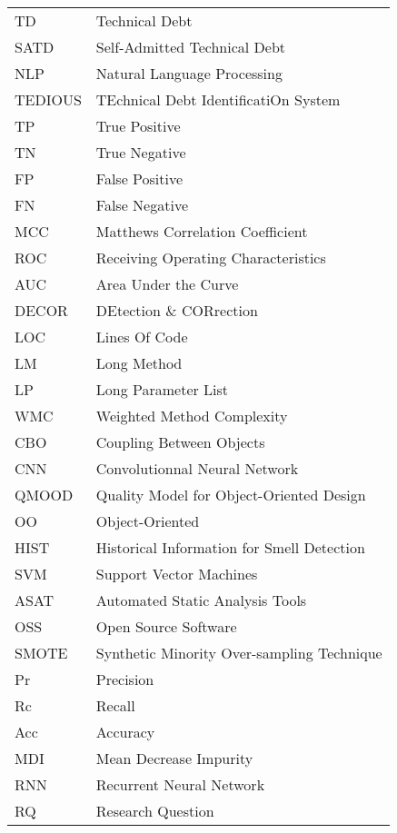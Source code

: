 \begin{longtable}{lp{5in}}
TD			    & Technical Debt\\
SATD		 & Self-Admitted Technical Debt\\
NLP			   & Natural Language Processing\\
TEDIOUS	   & TEchnical Debt IdentificatiOn System\\
TP				& True Positive\\
TN				& True Negative\\
FP				& False Positive\\
FN				& False Negative\\
MCC			  & Matthews Correlation Coefficient\\
ROC			  & Receiving Operating Characteristics\\
AUC			  & Area Under the Curve\\
DECOR	    & DEtection \& CORrection\\
LOC			   & Lines Of Code\\
LM				& Long Method\\
LP				 & Long Parameter List\\
WMC			 & Weighted Method Complexity\\
CBO			  & Coupling Between Objects\\
CNN			  & Convolutionnal Neural Network\\
QMOOD	   & Quality Model for Object-Oriented Design\\
OO			   & Object-Oriented\\
HIST		   & Historical Information for Smell Detection\\
SVM			  & Support Vector Machines\\
ASAT		  & Automated Static Analysis Tools\\
OSS			   & Open Source Software\\
SMOTE		& Synthetic Minority Over-sampling Technique\\
Pr				 & Precision\\
Rc				 & Recall\\
Acc			    & Accuracy\\
MDI			    & Mean Decrease Impurity\\
RNN			   & Recurrent Neural Network\\
RQ				& Research Question\\
\end{longtable}

